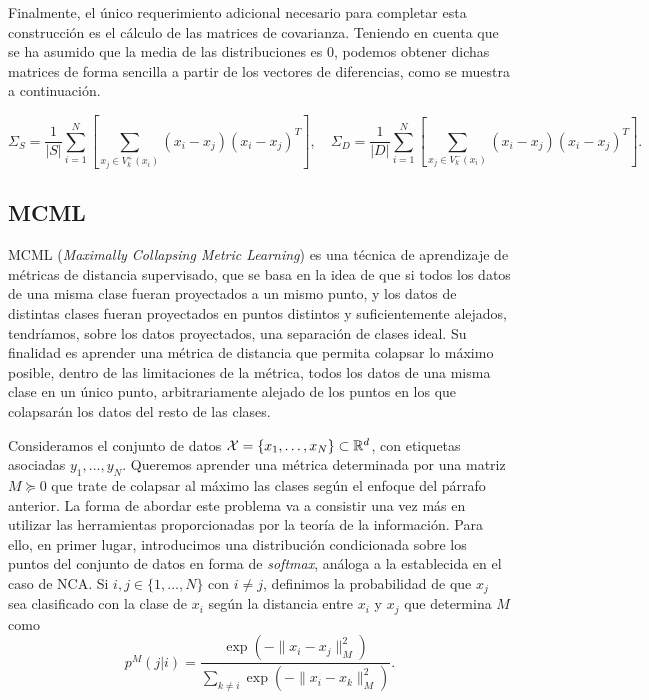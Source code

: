 Finalmente, el único requerimiento adicional necesario para completar esta construcción es el cálculo de las matrices de covarianza. Teniendo en cuenta que se ha asumido que la media de las distribuciones es 0, podemos obtener dichas matrices de forma sencilla a partir de los vectores de diferencias, como se muestra a continuación.

\begin{equation*}
    \Sigma_S = \frac{1}{|S|}\sum_{i=1}^{N} \left[ \sum_{x_j \in V_k^+(x_i)} (x_i-x_j)(x_i-x_j)^T\right], \quad \Sigma_D = \frac{1}{|D|}\sum_{i=1}^{N} \left[ \sum_{x_j \in V_k^-(x_i)} (x_i-x_j)(x_i-x_j)^T\right].
\end{equation*}


\subsection{MCML}

MCML (\emph{Maximally Collapsing Metric Learning}) \cite{mcml} es una técnica de aprendizaje de métricas de distancia supervisado, que se basa en la idea de que si todos los datos de una misma clase fueran proyectados a un mismo punto, y los datos de distintas clases fueran proyectados en puntos distintos y suficientemente alejados, tendríamos, sobre los datos proyectados, una separación de clases ideal.  Su finalidad es aprender una métrica de distancia que permita colapsar lo máximo posible, dentro de las limitaciones de la métrica, todos los datos de una misma clase en un único punto, arbitrariamente alejado de los puntos en los que colapsarán los datos del resto de las clases.

Consideramos el conjunto de datos $\mathcal{X} = \{x_1,\dots,x_N\} \subset \mathbb{R}^d$, con etiquetas asociadas $y_1,\dots,y_N$. Queremos aprender una métrica determinada por una matriz $M \succeq 0$ que trate de colapsar al máximo las clases según el enfoque del párrafo anterior. La forma de abordar este problema va a consistir una vez más en utilizar las herramientas proporcionadas por la teoría de la información. Para ello, en primer lugar, introducimos una distribución condicionada sobre los puntos del conjunto de datos en forma de \emph{softmax}, análoga a la establecida en el caso de NCA. Si $i,j \in \{1,\dots,N\}$ con $i \ne j$, definimos la probabilidad de que $x_j$ sea clasificado con la clase de $x_i$ según la distancia entre $x_i$ y $x_j$ que determina $M$ como
\begin{equation}
    p^{M}(j|i) = \frac{\exp(-\|x_i-x_j\|^2_M)}{\sum\limits_{k\ne i} \exp(-\|x_i-x_k\|^2_M)}.
\end{equation}

